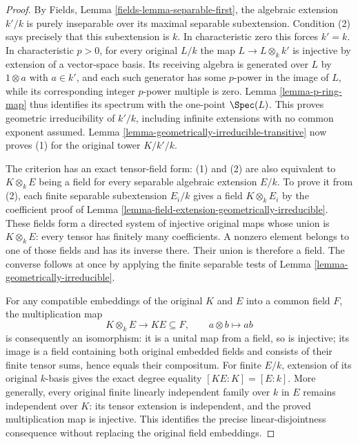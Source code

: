 \begin{proof}
By Fields, Lemma
\ref{fields-lemma-separable-first},
the algebraic extension $k'/k$
is purely inseparable over its
maximal separable subextension.
Condition (2) says precisely
that this subextension is $k$.
In characteristic zero this
forces $k'=k$. In characteristic
$p>0$, for every original $L/k$
the map $L\to L\otimes_k k'$
is injective by extension of
a vector-space basis. Its
receiving algebra is generated
over $L$ by $1\otimes a$ with
$a\in k'$, and each such
generator has some $p$-power
in the image of $L$, while
its corresponding integer
$p$-power multiple is zero.
Lemma \ref{lemma-p-ring-map}
thus identifies its spectrum
with the one-point $\Spec(L)$.
This proves geometric
irreducibility of $k'/k$,
including infinite extensions
with no common exponent assumed.
Lemma
\ref{lemma-geometrically-irreducible-transitive}
now proves (1) for the original
tower $K/k'/k$.

The criterion has an exact
tensor-field form: (1) and (2)
are also equivalent to
$K\otimes_k E$ being a field
for every separable algebraic
extension $E/k$. To prove it
from (2), each finite separable
subextension $E_i/k$ gives a
field $K\otimes_k E_i$ by the
coefficient proof of Lemma
\ref{lemma-field-extension-geometrically-irreducible}.
These fields form a directed
system of injective original
maps whose union is
$K\otimes_k E$: every tensor
has finitely many coefficients.
A nonzero element belongs to
one of those fields and has
its inverse there. Their union
is therefore a field. The
converse follows at once by
applying the finite separable
tests of Lemma
\ref{lemma-geometrically-irreducible}.

For any compatible embeddings
of the original $K$ and $E$
into a common field $F$, the
multiplication map
$$
K\otimes_k E\longrightarrow KE\subseteq F,
\qquad a\otimes b\longmapsto ab
$$
is consequently an isomorphism:
it is a unital map from a field,
so is injective; its image is
a field containing both original
embedded fields and consists of
their finite tensor sums, hence
equals their compositum.
For finite $E/k$, extension of
its original $k$-basis gives
the exact degree equality
$[KE:K]=[E:k]$. More generally,
every original finite linearly
independent family over $k$
in $E$ remains independent
over $K$: its tensor extension
is independent, and the proved
multiplication map is injective.
This identifies the precise
linear-disjointness consequence
without replacing the original
field embeddings.
\end{proof}